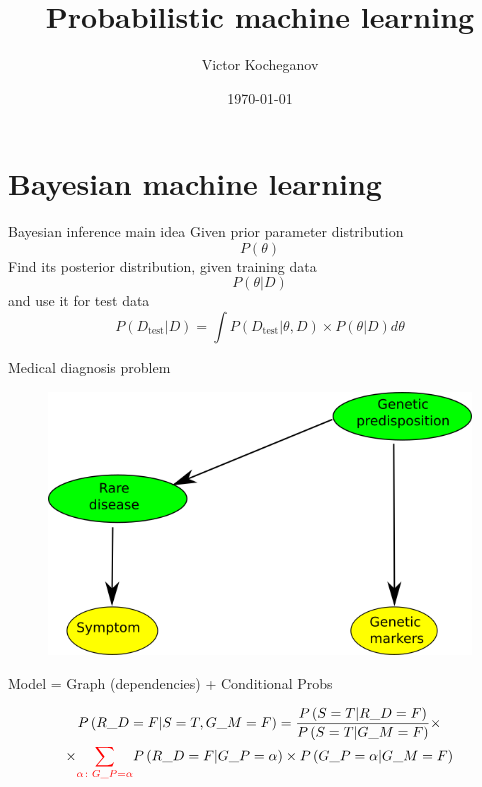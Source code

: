 \documentclass[12pt]{beamer}
\begin{document}
\title{Probabilistic machine learning}
\author{Victor Kocheganov}
\date{\today} 



\section{Bayesian machine learning}


\begin{frame}{Bayesian inference main idea}
Given prior parameter distribution 
$$
P(\theta)
$$
Find its posterior distribution, given training data
$$
P(\theta|D)
$$
and use it for test data
$$
P(D_{\text{test}}|D) = \int P(D_{\text{test}}|\theta,D)\times P(\theta|D) d\theta
$$
\end{frame}


\begin{frame}{Medical diagnosis problem}
\begin{figure}
\includegraphics[scale=0.3]{medical.png} 
\end{figure}
Model = Graph (dependencies) + Conditional Probs

\begin{multline*}
P\left(R\_D = F | S = T, G\_M=F\right)=\frac{P\left(S = T | R\_D = F\right)}{P\left(S=T |G\_M=F\right)} \times \\ 
\times{\color{red}\sum_{\alpha\colon G\_P=\alpha} }P\left(R\_D=F|G\_P=\alpha\right)\times P\left(G\_P=\alpha|G\_M=F\right)
\end{multline*}
\end{frame}
\end{document}
